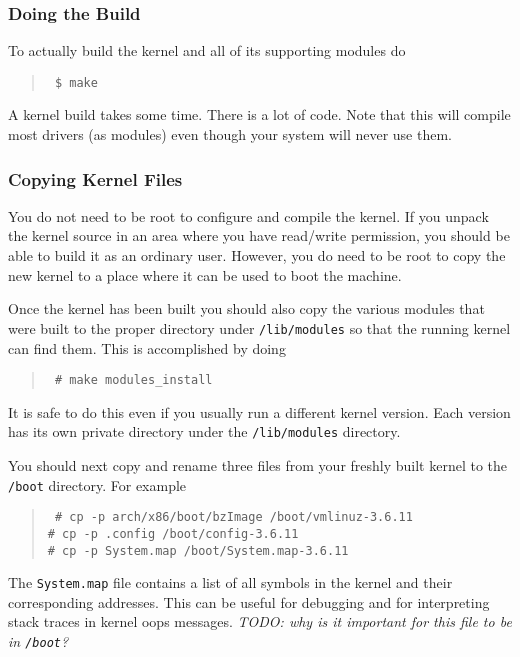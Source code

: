\documentclass{article}
\newcommand{\filename}[1]{\texttt{#1}}   %
\newcommand{\todo}[1]{\textit{TODO: #1}}
\newenvironment{commands}
  {\begin{quote} \tt}
  {\end{quote}}
\begin{document}
\subsubsection{Doing the Build}

To actually build the kernel and all of its supporting modules do
\begin{commands}
\$ make
\end{commands}

A kernel build takes some time. There is a lot of code. Note that this will compile most drivers
(as modules) even though your system will never use them.

\subsubsection{Copying Kernel Files}

You do not need to be root to configure and compile the kernel. If you unpack the kernel source
in an area where you have read/write permission, you should be able to build it as an ordinary
user. However, you do need to be root to copy the new kernel to a place where it can be used to
boot the machine.

Once the kernel has been built you should also copy the various modules that were built to the
proper directory under \filename{/lib/modules} so that the running kernel can find them. This is
accomplished by doing
\begin{commands}
\# make modules\_install
\end{commands}

It is safe to do this even if you usually run a different kernel version. Each version has its
own private directory under the \filename{/lib/modules} directory.

You should next copy and rename three files from your freshly built kernel to the
\filename{/boot} directory. For example
\begin{commands}
\# cp -p arch/x86/boot/bzImage /boot/vmlinuz-3.6.11 \\
\# cp -p .config /boot/config-3.6.11 \\
\# cp -p System.map /boot/System.map-3.6.11
\end{commands}

The \filename{System.map} file contains a list of all symbols in the kernel and their
corresponding addresses. This can be useful for debugging and for interpreting stack traces in
kernel oops messages. \todo{why is it important for this file to be in \filename{/boot}?}
\end{document}
